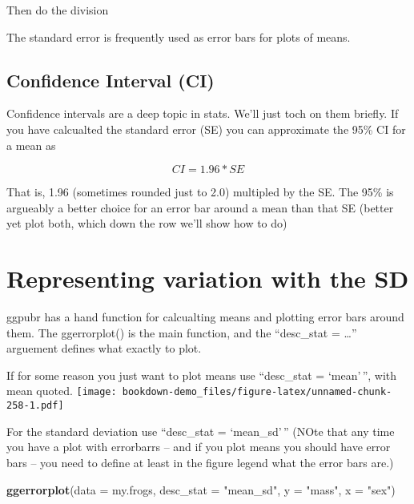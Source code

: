 \documentclass[]{book}
\newenvironment{Shaded}{\begin{snugshade}}{\end{snugshade}}
\newcommand{\KeywordTok}[1]{\textcolor[rgb]{0.13,0.29,0.53}{\textbf{#1}}}
\newcommand{\DataTypeTok}[1]{\textcolor[rgb]{0.13,0.29,0.53}{#1}}
\newcommand{\StringTok}[1]{\textcolor[rgb]{0.31,0.60,0.02}{#1}}
\newcommand{\OperatorTok}[1]{\textcolor[rgb]{0.81,0.36,0.00}{\textbf{#1}}}
\newcommand{\NormalTok}[1]{#1}
\theoremstyle{definition}
\theoremstyle{definition}
\theoremstyle{definition}
\theoremstyle{remark}
\begin{document}
\begin{Shaded}
\end{Shaded}

Then do the division

The standard error is frequently used as error bars for plots of means.

\subsection{Confidence Interval (CI)}\label{confidence-interval-ci}

Confidence intervals are a deep topic in stats. We'll just toch on them
briefly. If you have calcualted the standard error (SE) you can
approximate the 95\% CI for a mean as

\[CI = 1.96*SE\]

That is, 1.96 (sometimes rounded just to 2.0) multipled by the SE. The
95\% is argueably a better choice for an error bar around a mean than
that SE (better yet plot both, which down the row we'll show how to do)

\section{Representing variation with the
SD}\label{representing-variation-with-the-sd}

ggpubr has a hand function for calcualting means and plotting error bars
around them. The ggerrorplot() is the main function, and the
``desc\_stat = \ldots{}'' arguement defines what exactly to plot.

If for some reason you just want to plot means use ``desc\_stat =
`mean'\,'', with mean quoted.
\texttt{[image: bookdown-demo\_files/figure-latex/unnamed-chunk-258-1.pdf]}

For the standard deviation use ``desc\_stat = `mean\_sd'\,'' (NOte that
any time you have a plot with errorbarrs -- and if you plot means you
should have error bars -- you need to define at least in the figure
legend what the error bars are.)

\begin{Shaded}
\begin{Highlighting}[]
\KeywordTok{ggerrorplot}\NormalTok{(}\DataTypeTok{data =}\NormalTok{ my.frogs,}
            \DataTypeTok{desc_stat =} \StringTok{"mean_sd"}\NormalTok{,}
          \DataTypeTok{y =} \StringTok{"mass"}\NormalTok{,}
          \DataTypeTok{x =} \StringTok{"sex"}\NormalTok{)}
\end{Highlighting}
\end{Shaded}
\end{document}
